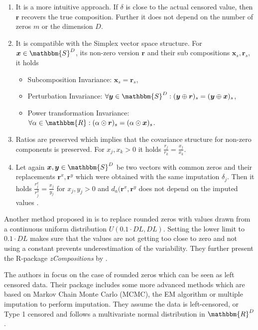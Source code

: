\begin{enumerate}
	\item It is a more intuitive approach. If $\delta$ is close to the actual censored value, then $\bm{r}$ recovers the true composition. Further it does not depend on the number of zeros $m$ or the dimension $D$. 
	\item It is compatible with the Simplex vector space structure. For $\bm{x} \in \mathbbm{S}^D$, its non-zero version $\bm{r}$ and their sub compositions $\bm{x}_s,\bm{r}_s$, it holds 
	\begin{itemize}
		\item Subcomposition Invariance: $\bm{x}_s = \bm{r}_s$,
		\item Perturbation Invariance: $\forall \bm{y} \in \mathbbm{S}^D: (\bm{y} \oplus \bm{r})_s = (\bm{y} \oplus \bm{x})_s$,
		\item Power transformation Invariance: $\forall \alpha \in \mathbbm{R}: (\alpha \odot \bm{r})_s = (\alpha \odot \bm{x})_s$. 
	\end{itemize}
	\item Ratios are preserved which implies that the covariance structure for non-zero components is preserved. For  $x_j,x_k >0$ it holds $\frac{r_j}{r_k} = \frac{x_j}{x_k}$. 
	\item Let again $\bm{x},\bm{y} \in \mathbbm{S}^D$ be two vectors with common zeros and their replacements $\bm{r}^x,\bm{r}^y$ which were obtained with the same imputation $\delta_j$. Then it holds $\frac{r^x_j}{r^y_j}=\frac{x_j}{y_j}$ for $x_j,y_j>0$ and $d_a(\bm{r}^x,\bm{r}^y$ does not depend on the imputed values \cite{Josep:2003}. 
\end{enumerate}

Another method proposed in \cite{Lubbe:2021} is to replace rounded zeros with values drawn from a continuous uniform distribution $U(0.1\cdot DL,DL)$. Setting the lower limit to $0.1\cdot DL$ makes sure that the values are not getting too close to zero and not using a constant prevents underestimation of the variability. They further present the R-package \textit{zCompositions} by \cite{Palarea-Albaladejo:2015}. 

The authors in \cite{Palarea-Albaladejo:2015} focus on the case of rounded zeros which can be seen as left censored data. Their package includes some more advanced methods which are based on Markov Chain Monte Carlo (MCMC), the EM algorithm or multiple imputation to perform imputation. They assume the data is left-censored, or Type 1 censored and follows a multivariate normal distribution in $\mathbbm{R}^D$. 

